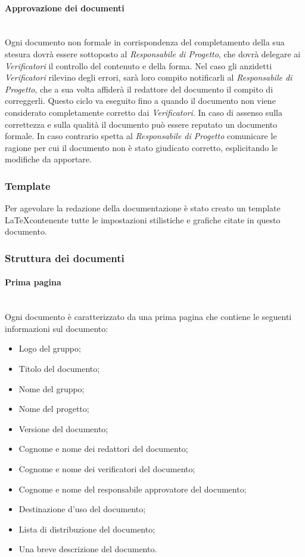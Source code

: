 		\paragraph{Approvazione dei documenti} \mbox{} \\
		Ogni documento non formale in corrispondenza del completamento della sua stesura dovrà essere sottoposto al \textit{Responsabile di Progetto}, che dovrà delegare ai \textit{Verificatori} il controllo del contenuto e della forma. Nel caso gli anzidetti \textit{Verificatori} rilevino degli errori, sarà loro compito notificarli al \textit{Responsabile di Progetto}, che a sua volta affiderà il redattore del documento il compito di correggerli. Questo ciclo va eseguito fino a quando il documento non viene considerato completamente corretto dai  \textit{Verificatori}. In caso di assenso sulla correttezza e sulla qualità il documento può essere reputato un documento formale. In caso contrario spetta al \textit{Responsabile di Progetto} comunicare le ragione per cui il documento non è stato giudicato corretto, esplicitando le modifiche da apportare.
		
	\subsubsection{Template}
	Per agevolare la redazione della documentazione è stato creato un template \LaTeX contenente tutte le impostazioni stilistiche e grafiche citate in questo documento.
	
	\subsubsection{Struttura dei documenti}
	
		\paragraph{Prima pagina}\mbox{} \\
		Ogni documento è caratterizzato da una prima pagina che contiene le seguenti informazioni sul documento:
		\begin{itemize}
			\item Logo del gruppo;
			\item Titolo del documento;
			\item Nome del gruppo;
			\item Nome del progetto;
			\item Versione del documento;
			\item Cognome e nome dei redattori del documento;
			\item Cognome e nome dei verificatori del documento;
			\item Cognome e nome del responsabile approvatore del documento;
			\item Destinazione d’uso del documento;
			\item Lista di distribuzione del documento;
			\item Una breve descrizione del documento.
		\end{itemize}
	
